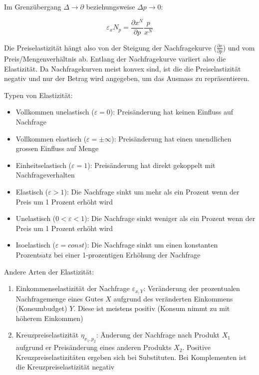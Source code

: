 \documentclass[9pt, landscape, fleqn]{scrartcl}
\begin{document}
\begin{multicols*}{3}
Im Grenzübergang $\Delta \rightarrow \partial$ beziehungsweise $\Delta p \rightarrow 0$:

\begin{equation}
    \varepsilon_x N_p = \frac{\partial x^N}{\partial p}\frac{p}{x^N}
\end{equation}

Die Preiselastizität hängt also von der Steigung der Nachfragekurve ($\frac{\partial x}{\partial p}$) und vom Preis/Mengenverhältnis ab. Entlang der Nachfragekurve variiert also die Elastizität. Da Nachfragekurven meist konvex sind, ist die die Preiselastizität negativ und nur der Betrag wird angegeben,
um das Ausmass zu repräsentieren. \newline \newline

Typen von Elastizität: 
    \begin{itemize}
        \item Vollkommen unelastisch ($\varepsilon = 0$): Preisänderung hat keinen Einfluss auf Nachfrage 
        \item Vollkommen elastisch ($\varepsilon = \pm \infty$): Preisänderung hat einen unendlichen grossen Einfluss auf Menge 
        \item Einheitselastisch ($\varepsilon = 1$): Preisänderung hat direkt gekoppelt mit Nachfrageverhalten 
        \item Elastisch ($\varepsilon > 1$): Die Nachfrage sinkt um mehr als ein Prozent wenn der Preis um 1 Prozent erhöht wird
        \item Unelastisch ($0<\varepsilon<1$): Die Nachfrage sinkt weniger als ein Prozent wenn der Preis um 1 Prozent erhöht wird
        \item Isoelastisch ($\varepsilon = const$): Die Nachfrage sinkt um einen konstanten Prozentsatz bei einer 1-prozentigen Erhöhung der Nachfrage
    \end{itemize}

Andere Arten der Elastizität: 

    \begin{enumerate}
        \item Einkommenselastizität der Nachfrage $\varepsilon_{x,Y}$: Veränderung der prozentualen Nachfragemenge eines Gutes $X$ aufgrund des veränderten Einkommens (Konsumbudget) $Y$. Diese ist meistens positiv (Konsum nimmt zu mit höherem Einkommen)
        \item Kreuzpreiselastizität $\eta_{x_1,p_2}$: Änderung der Nachfrage nach Produkt $X_1$ aufgrund er Preisänderung eines anderen Produkts $X_2$. Positive Kreuzpreiselastizitäten ergeben sich bei Substituten. Bei Komplementen ist die Kreuzpreiselastizität negativ 
    \end{enumerate}


\end{multicols*}
\end{document}
